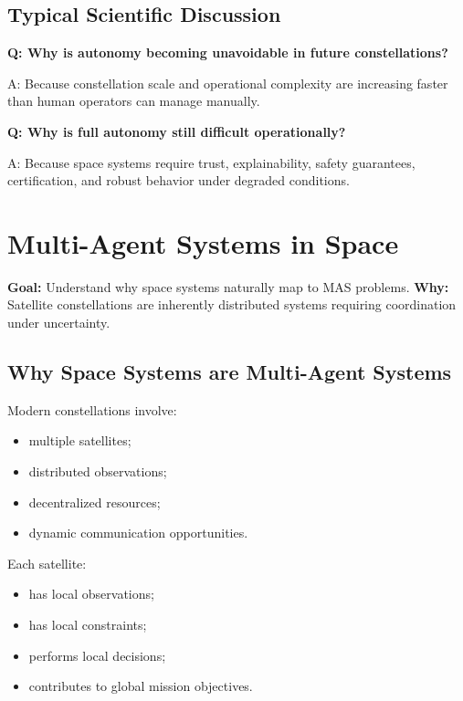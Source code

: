 \documentclass[10pt,a4paper,twocolumn]{article}
\newcommand{\lesson}[3]{
\section{#1}
\noindent
\textbf{Goal:} #2 \newline
\textbf{Why:} #3
\vspace{0.1em}
}
\begin{document}
\subsection{Typical Scientific Discussion}

\begin{questionbox}
    \textbf{Q: Why is autonomy becoming unavoidable in future constellations?}

    A: Because constellation scale and operational complexity are increasing faster than human operators can manage manually.
\end{questionbox}

\begin{questionbox}
    \textbf{Q: Why is full autonomy still difficult operationally?}

    A: Because space systems require trust, explainability, safety guarantees, certification, and robust behavior under degraded conditions.
\end{questionbox}



\lesson
{Multi-Agent Systems in Space}
{Understand why space systems naturally map to MAS problems.}
{Satellite constellations are inherently distributed systems requiring coordination under uncertainty.}


\subsection{Why Space Systems are Multi-Agent Systems}

Modern constellations involve:
\begin{itemize}
    \item multiple satellites;
    \item distributed observations;
    \item decentralized resources;
    \item dynamic communication opportunities.
\end{itemize}

Each satellite:
\begin{itemize}
    \item has local observations;
    \item has local constraints;
    \item performs local decisions;
    \item contributes to global mission objectives.
\end{itemize}
\end{document}
